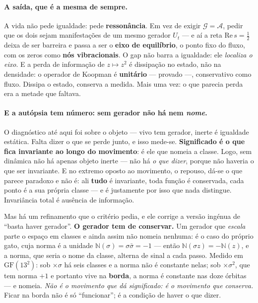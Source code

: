 \documentclass[11pt]{article}
\providecommand{\N}{\mathbb N}
\theoremstyle{plain}
\theoremstyle{remark}
\begin{document}
\paragraph{A saída, que é a mesma de sempre.} A vida não pede igualdade: pede
\textbf{ressonância}. Em vez de exigir $\mathcal{G}=\mathcal{A}$, pedir que os dois
sejam manifestações de um mesmo gerador $U_t$ --- e aí a reta $\mathrm{Re}\,s=\tfrac12$
deixa de ser barreira e passa a ser o \textbf{eixo de equilíbrio}, o ponto fixo do
fluxo, com os zeros como \textbf{nós vibracionais}. O gap não barra a igualdade: ele
\emph{localiza o eixo}. E a perda de informação de $z\mapsto z^2$ é dissipação no
estado, não na densidade: o operador de Koopman é \textbf{unitário} --- provado ---,
conservativo como fluxo. Dissipa o estado, conserva a medida. Mais uma vez: o que
parecia perda era a metade que faltava.

\paragraph{E a autópsia tem número: sem gerador não há nem \emph{nome}.} O diagnóstico até aqui
foi sobre o objeto --- vivo tem gerador, inerte é igualdade estática. Falta dizer o que se perde
junto, e isso mede-se. \textbf{Significado é o que fica invariante ao longo do movimento}: é ele
que nomeia a classe. Logo, sem dinâmica não há apenas objeto inerte --- não há \emph{o que dizer},
porque não haveria o que ser invariante. E no extremo oposto ao movimento, o repouso, dá-se o que
parece paradoxo e não é: ali \textbf{tudo} é invariante, toda função é conservada, cada ponto é a
sua própria classe --- e é justamente por isso que nada distingue. Invariância total é ausência de
informação.

\noindent Mas há um refinamento que o critério pedia, e ele corrige a versão ingénua de ``basta
haver gerador''. \textbf{O gerador tem de conservar.} Um gerador que \emph{escala} parte o espaço
em classes e ainda assim não nomeia nenhuma: é o caso do próprio gato, cuja norma é a unidade
$\N(\sigma)=\sigma\bar\sigma=-1$ --- então $\N(\sigma z)=-\N(z)$, e a norma, que seria o nome da
classe, alterna de sinal a cada passo. Medido em $\mathrm{GF}(13^2)$: sob $\times\sigma$ há seis
classes e a norma não é constante nelas; sob $\times\sigma^2$, que tem norma $+1$ e portanto vive
na \textbf{borda}, a norma é constante nas doze órbitas --- e nomeia. \emph{Não é o movimento que
dá significado: é o movimento que conserva.} Ficar na borda não é só ``funcionar''; é a condição
de haver o que dizer.
\end{document}
